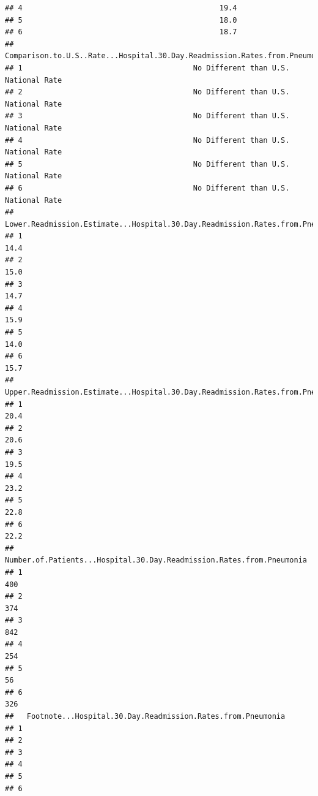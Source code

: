 \documentclass[
]{article}
\begin{document}
\begin{verbatim}
## 4                                             19.4
## 5                                             18.0
## 6                                             18.7
##   Comparison.to.U.S..Rate...Hospital.30.Day.Readmission.Rates.from.Pneumonia
## 1                                       No Different than U.S. National Rate
## 2                                       No Different than U.S. National Rate
## 3                                       No Different than U.S. National Rate
## 4                                       No Different than U.S. National Rate
## 5                                       No Different than U.S. National Rate
## 6                                       No Different than U.S. National Rate
##   Lower.Readmission.Estimate...Hospital.30.Day.Readmission.Rates.from.Pneumonia
## 1                                                                          14.4
## 2                                                                          15.0
## 3                                                                          14.7
## 4                                                                          15.9
## 5                                                                          14.0
## 6                                                                          15.7
##   Upper.Readmission.Estimate...Hospital.30.Day.Readmission.Rates.from.Pneumonia
## 1                                                                          20.4
## 2                                                                          20.6
## 3                                                                          19.5
## 4                                                                          23.2
## 5                                                                          22.8
## 6                                                                          22.2
##   Number.of.Patients...Hospital.30.Day.Readmission.Rates.from.Pneumonia
## 1                                                                   400
## 2                                                                   374
## 3                                                                   842
## 4                                                                   254
## 5                                                                    56
## 6                                                                   326
##   Footnote...Hospital.30.Day.Readmission.Rates.from.Pneumonia
## 1                                                            
## 2                                                            
## 3                                                            
## 4                                                            
## 5                                                            
## 6
\end{verbatim}
\end{document}
